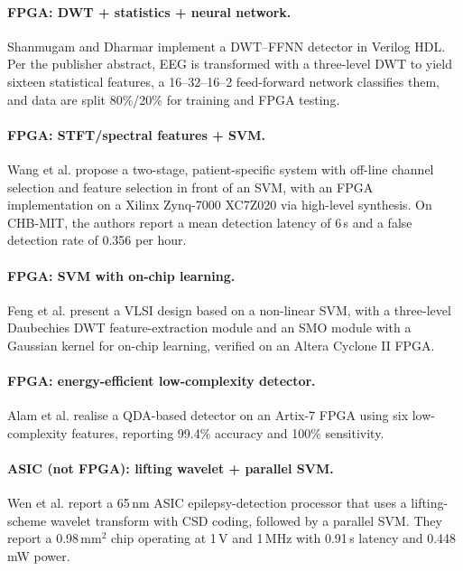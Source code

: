 \documentclass[10pt,twocolumn,letterpaper]{article}
\begin{document}
\paragraph{FPGA: DWT + statistics + neural network.} Shanmugam and
Dharmar \cite{shanmugam2025ffnn} implement a DWT--FFNN detector in
Verilog HDL. Per the publisher abstract, EEG is transformed with a
three-level DWT to yield sixteen statistical features, a 16--32--16--2
feed-forward network classifies them, and data are split 80\%/20\%
for training and FPGA testing.

\paragraph{FPGA: STFT/spectral features + SVM.} Wang et al.
\cite{wang2017integrating} propose a two-stage, patient-specific system
with off-line channel selection and feature selection in front of an SVM,
with an FPGA implementation on a Xilinx Zynq-7000 XC7Z020 via
high-level synthesis. On CHB-MIT, the authors report a mean detection
latency of 6\,s and a false detection rate of 0.356 per hour.

\paragraph{FPGA: SVM with on-chip learning.} Feng et al.
\cite{feng2018vlsi} present a VLSI design based on a non-linear SVM,
with a three-level Daubechies DWT feature-extraction module and an SMO module with a Gaussian kernel for on-chip learning, verified on an Altera Cyclone II FPGA.

\paragraph{FPGA: energy-efficient low-complexity detector.} Alam et al.
\cite{alam2024qda} realise a QDA-based detector on an Artix-7 FPGA using
six low-complexity features, reporting 99.4\% accuracy and 100\% sensitivity.

\paragraph{ASIC (not FPGA): lifting wavelet + parallel SVM.} Wen et al.
\cite{wen2022asic} report a 65\,nm ASIC epilepsy-detection
processor that uses a lifting-scheme wavelet transform with CSD coding, followed by a parallel SVM. They report a 0.98\,mm$^2$ chip operating at 1\,V and 1\,MHz with 0.91\,s latency and 0.448\,mW power.
\end{document}
